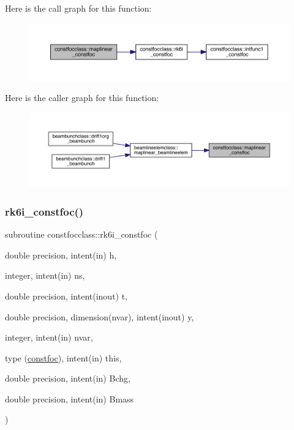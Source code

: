 Here is the call graph for this function\+:\nopagebreak
\begin{figure}[H]
\begin{center}
\leavevmode
\includegraphics[width=350pt]{namespaceconstfocclass_af393c0fed039b82c7eb2aa347bc12bd8_cgraph}
\end{center}
\end{figure}
Here is the caller graph for this function\+:\nopagebreak
\begin{figure}[H]
\begin{center}
\leavevmode
\includegraphics[width=350pt]{namespaceconstfocclass_af393c0fed039b82c7eb2aa347bc12bd8_icgraph}
\end{center}
\end{figure}
\mbox{\label{namespaceconstfocclass_a25aa498c0852e2952880172b61f0f034}} 
\subsubsection{\texorpdfstring{rk6i\_constfoc()}{rk6i\_constfoc()}}
{\footnotesize\ttfamily subroutine constfocclass\+::rk6i\+\_\+constfoc (\begin{DoxyParamCaption}\item[{double precision, intent(in)}]{h,  }\item[{integer, intent(in)}]{ns,  }\item[{double precision, intent(inout)}]{t,  }\item[{double precision, dimension(nvar), intent(inout)}]{y,  }\item[{integer, intent(in)}]{nvar,  }\item[{type (\mbox{\hyperlink{namespaceconstfocclass_structconstfocclass_1_1constfoc}{constfoc}}), intent(in)}]{this,  }\item[{double precision, intent(in)}]{Bchg,  }\item[{double precision, intent(in)}]{Bmass }\end{DoxyParamCaption})}

